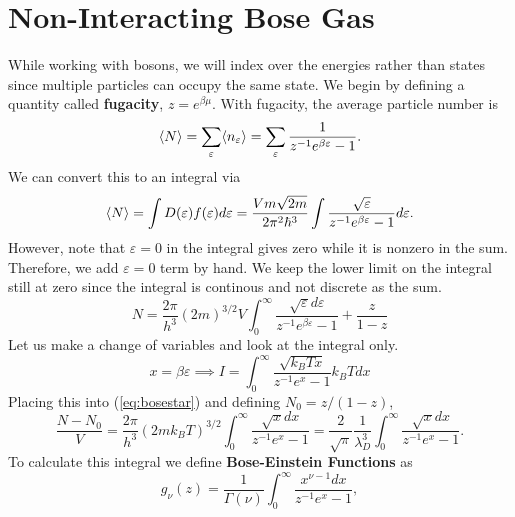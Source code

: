     \section{Non-Interacting Bose Gas}
        While working with bosons, we will index over the energies rather than states since multiple particles can occupy the same state. We begin by defining a quantity called \textbf{fugacity}, $z=e^{\beta\mu}$. With fugacity, the average particle number is 
        \begin{equation}
            \langle N \rangle = \sum_\varepsilon\langle n_\varepsilon \rangle = \sum_\varepsilon\frac{1}{z^{-1}e^{\beta\varepsilon}-1}.
        \end{equation}
        We can convert this to an integral via
        \begin{equation}
            \langle N \rangle = \int D(\varepsilon)f(\varepsilon)d\varepsilon = \frac{Vm\sqrt{2m}}{2\pi^2\hbar^3}\int\frac{\sqrt{\varepsilon}}{z^{-1}e^{\beta\varepsilon}-1}d\varepsilon.
        \end{equation}
        However, note that $\varepsilon=0$ in the integral gives zero while it is nonzero in the sum. Therefore, we add $\varepsilon=0$ term by hand. We keep the lower limit on the integral still at zero since the integral is continous and not discrete as the sum.
        \begin{equation}\label{eq:bosestar}
            N = \frac{2\pi}{h^3}(2m)^{3/2}V\int_{0}^{\infty}\frac{\sqrt{\varepsilon}d\varepsilon}{z^{-1}e^{\beta\varepsilon}-1}+ \frac{z}{1-z}
        \end{equation}
        Let us make a change of variables and look at the integral only. 
        \begin{equation}
            x = \beta\varepsilon \implies I  = \int_{0}^{\infty}\frac{\sqrt{k_BTx}}{z^{-1}e^x-1}k_BTdx
        \end{equation}
        Placing this into (\ref{eq:bosestar}) and defining $N_0 = z/(1-z)$, 
        \begin{equation}
            \frac{N-N_0}{V} = \frac{2\pi}{h^3}(2mk_BT)^{3/2}\int_{0}^{\infty}\frac{\sqrt{x}dx}{z^{-1}e^x-1}=\frac{2}{\sqrt{\pi}}\frac{1}{\lambda_D^3}\int_{0}^{\infty}\frac{\sqrt{x}dx}{z^{-1}e^x-1}.
        \end{equation}
        To calculate this integral we define \textbf{Bose-Einstein Functions} as
        \begin{equation}
            g_\nu(z)=\frac{1}{\Gamma(\nu)}\int_{0}^{\infty}\frac{x^{\nu-1}dx}{z^{-1}e^x-1},
        \end{equation}
